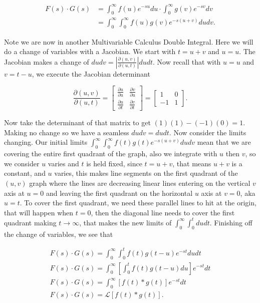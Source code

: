\documentclass[12pt]{article}
\newcommand{\lp}{\mathscr{L}}
\begin{document}
\begin{align*}
    F(s)\cdot G(s) &= \int_0^{\infty} f(u) e^{-su} du \cdot \int_0^{\infty} g(v) e^{-sv} dv \\
    &= \int_0^{\infty} \int_0^{\infty} f(u)g(v)e^{-s(u+v)}dudv.
\end{align*}

Note we are now in another Multivariable  Calculus Double Integral. Here we will do a change of variables with a Jacobian. We start with $t=u+v$ and $u=u$. The Jacobian makes a change of $dudv=\left|\frac{\partial(u,v)}{\partial(u,t)}\right|dudt$. Now recall that with $u=u$ and $v=t-u$, we execute the Jacobian determinant

\begin{equation*}
    \frac{\partial(u,v)}{\partial(u,t)}=\begin{bmatrix} \frac{\partial u}{\partial u} & \frac{\partial v}{\partial u} \\ \frac{\partial u}{\partial t} & \frac{\partial v}{\partial t} \end{bmatrix} = \begin{bmatrix} 1 & 0 \\ -1 & 1 \end{bmatrix}.
\end{equation*}

Now take the determinant of that matrix to get $(1)(1)-(-1)(0)=1$. Making no change so we have a seamless $dudv=dudt$. Now consider the limits changing. Our initial limits $\int_0^{\infty} \int_0^{\infty} f(t)g(t)e^{-s(u+v)}dudv$ mean that we are covering the entire first quadrant of the graph, also we integrate with $u$ then $v$, so we consider $u$ varies and $t$ is held fixed, since $t=u+v$, that means $u+v$ is a constant, and $u$ varies, this makes line segments on the first quadrant of the $(u,v)$ graph where the lines are decreasing linear lines entering on the vertical $v$ axis at $u=0$ and leaving the first quadrant on the horizontal $u$ axis at $v=0$, aka $u=t$. To cover the first quadrant, we need these parallel lines to hit at the origin, that will happen when $t=0$, then the diagonal line needs to cover the first quadrant making $t\rightarrow\infty$, that makes the new limits of $\int_0^{\infty} \int_0^{t}dudt$. Finishing off the change of variables, we see that

\begin{align*}
    F(s)\cdot G(s) = \int_0^{\infty} \int_0^{t} f(t)g(t-u)e^{-st}dudt \\
    F(s)\cdot G(s) = \int_0^{\infty} \left[\int_0^{t} f(t)g(t-u)du\right] e^{-st}dt \\
    F(s)\cdot G(s) = \int_0^{\infty} [f(t) \ast g(t)]e^{-st}dt \\
    F(s)\cdot G(s) = \lp[f(t) \ast g(t)].
\end{align*}
\end{document}
